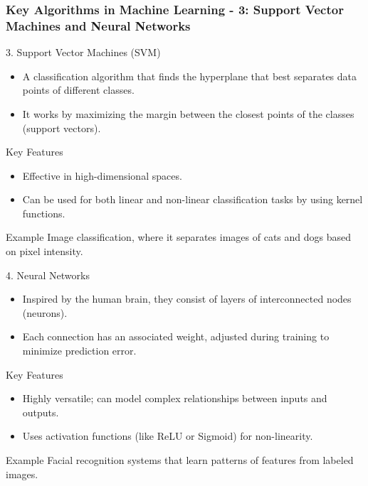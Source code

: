\documentclass{beamer}
\begin{document}
\begin{frame}[fragile]
    \frametitle{Key Algorithms in Machine Learning - 3: Support Vector Machines and Neural Networks}
    \begin{block}{3. Support Vector Machines (SVM)}
        \begin{itemize}
            \item A classification algorithm that finds the hyperplane that best separates data points of different classes.
            \item It works by maximizing the margin between the closest points of the classes (support vectors).
        \end{itemize}
        
        \begin{block}{Key Features}
            \begin{itemize}
                \item Effective in high-dimensional spaces.
                \item Can be used for both linear and non-linear classification tasks by using kernel functions.
            \end{itemize}
        \end{block}
        
        \begin{block}{Example}
            Image classification, where it separates images of cats and dogs based on pixel intensity.
        \end{block}
    \end{block}

    \begin{block}{4. Neural Networks}
        \begin{itemize}
            \item Inspired by the human brain, they consist of layers of interconnected nodes (neurons).
            \item Each connection has an associated weight, adjusted during training to minimize prediction error.
        \end{itemize}    
        
        \begin{block}{Key Features}
            \begin{itemize}
                \item Highly versatile; can model complex relationships between inputs and outputs.
                \item Uses activation functions (like ReLU or Sigmoid) for non-linearity.
            \end{itemize}
        \end{block}
        
        \begin{block}{Example}
            Facial recognition systems that learn patterns of features from labeled images.
        \end{block}
    \end{block}
\end{frame}
\end{document}
